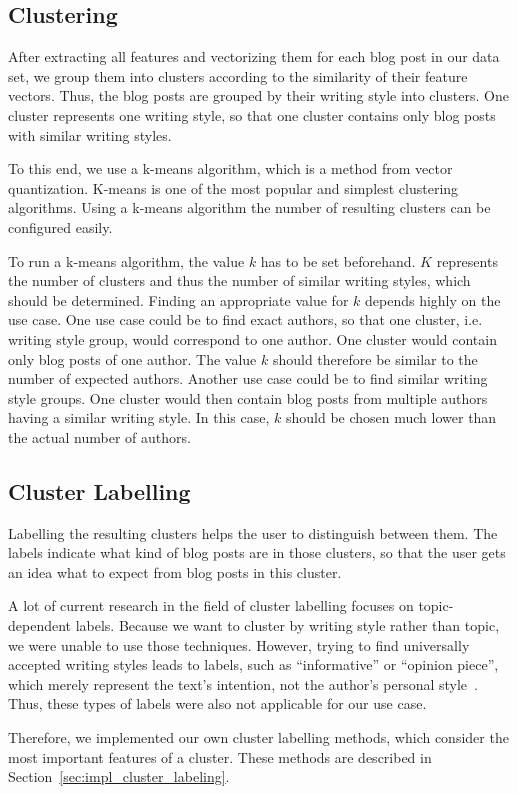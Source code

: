 
\subsection{Clustering}
\label{sec:clustering}

After extracting all features and vectorizing them for each blog post in our data set, we group them into clusters according to the similarity of their feature vectors.
Thus, the blog posts are grouped by their writing style into clusters.
One cluster represents one writing style, so that one cluster contains only blog posts with similar writing styles.


To this end, we use a k-means algorithm, which is a method from vector quantization.
K-means is one of the most popular and simplest clustering algorithms.
Using a k-means algorithm the number of resulting clusters can be configured easily.


To run a k-means algorithm, the value $k$ has to be set beforehand.
$K$ represents the number of clusters and thus the number of similar writing styles, which should be determined.
Finding an appropriate value for $k$ depends highly on the use case.
One use case could be to find exact authors, so that one cluster, i.e. writing style group, would correspond to one author.
One cluster would contain only blog posts of one author.
The value $k$ should therefore be similar to the number of expected authors.
Another use case could be to find similar writing style groups.
One cluster would then contain blog posts from multiple authors having a similar writing style.
In this case, $k$ should be chosen much lower than the actual number of authors.




\subsection{Cluster Labelling}
\label{sec:cluster_labeling}

Labelling the resulting clusters helps the user to distinguish between them.
The labels indicate what kind of blog posts are in those clusters, so that the user gets an idea what to expect from blog posts in this cluster.


A lot of current research in the field of cluster labelling focuses on topic-dependent labels.
Because we want to cluster by writing style rather than topic, we were unable to use those techniques.
However, trying to find universally accepted writing styles leads to labels, such as ``informative'' or ``opinion piece'', which merely represent the text's intention, not the author's personal style~\cite{lee2001genres}.
Thus, these types of labels were also not applicable for our use case.


Therefore, we implemented our own cluster labelling methods, which consider the most important features of a cluster.
These methods are described in Section~\ref{sec:impl_cluster_labeling}.